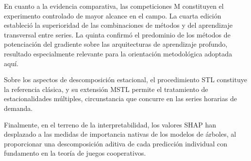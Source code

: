 En cuanto a la evidencia comparativa, las competiciones M constituyen el
experimento controlado de mayor alcance en el campo. La cuarta edición
\parencite{makridakis2020m4} estableció la superioridad de las combinaciones de
métodos y del aprendizaje transversal entre series. La quinta
\parencite{makridakis2022m5} confirmó el predominio de los métodos de potenciación
del gradiente sobre las arquitecturas de aprendizaje profundo, resultado
especialmente relevante para la orientación metodológica adoptada aquí.

Sobre los aspectos de descomposición estacional, el procedimiento STL
\parencite{cleveland1990stl} constituye la referencia clásica, y su extensión MSTL
\parencite{bandara2021mstl} permite el tratamiento de estacionalidades múltiples,
circunstancia que concurre en las series horarias de demanda.

Finalmente, en el terreno de la interpretabilidad, los valores SHAP
\parencite{lundberg2017shap} han desplazado a las medidas de importancia nativas
de los modelos de árboles, al proporcionar una descomposición aditiva de cada
predicción individual con fundamento en la teoría de juegos cooperativos.
